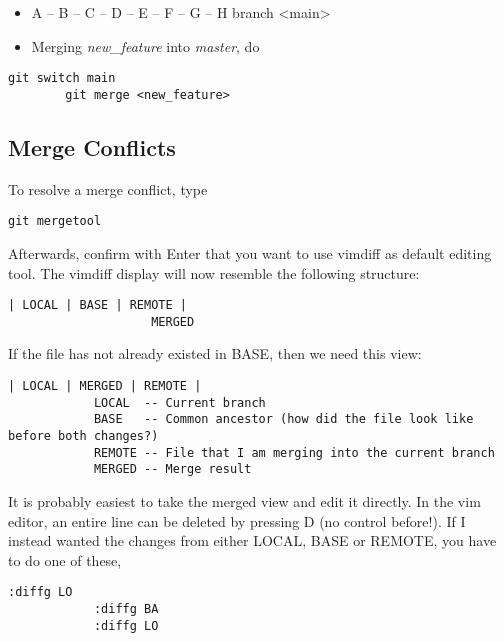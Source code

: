 \documentclass[12pt, a4paper]{article}
\numberwithin{equation}{section}
\theoremstyle{definition}
\theoremstyle{definition}
\begin{document}
	\begin{itemize} 
		\item A -- B -- C -- D -- E -- F -- G -- H branch <main>
		\item Merging \textit{new_feature} into \textit{master}, do 
	\end{itemize}

	\begin{lstlisting}[style=mystylebash, label=alg:merging1, xleftmargin=\parindent]
		git switch main
		git merge <new_feature>
	\end{lstlisting}
	
	\subsection{Merge Conflicts}
	
		To resolve a merge conflict, type 
		
		\begin{lstlisting}[style=mystylebash, label=alg:mergetool, xleftmargin=\parindent]
			git mergetool
		\end{lstlisting}

		Afterwards, confirm with Enter that you want to use vimdiff as default editing tool. The vimdiff display will now resemble the following structure: 
		
		\begin{lstlisting}[style=mystylebash, xleftmargin=\parindent]
			| LOCAL | BASE | REMOTE | 
					MERGED
		\end{lstlisting}
		
		If the file has not already existed in BASE, then we need this view: 

		\begin{lstlisting}[style=mystylebash, xleftmargin=\parindent]	
			| LOCAL | MERGED | REMOTE |
			LOCAL  -- Current branch
			BASE   -- Common ancestor (how did the file look like before both changes?)
			REMOTE -- File that I am merging into the current branch
			MERGED -- Merge result
		\end{lstlisting}

		It is probably easiest to take the merged view and edit it directly. In the vim editor, an entire line can be deleted by pressing D (no control before!). 
		If I instead wanted the changes from either LOCAL, BASE or REMOTE, you have to do one of these,
		
		\begin{lstlisting}[style=mystylebash, label=git_merge_view__actions, xleftmargin=\parindent]
			:diffg LO
			:diffg BA
			:diffg LO
		\end{lstlisting}
		
\end{document}
